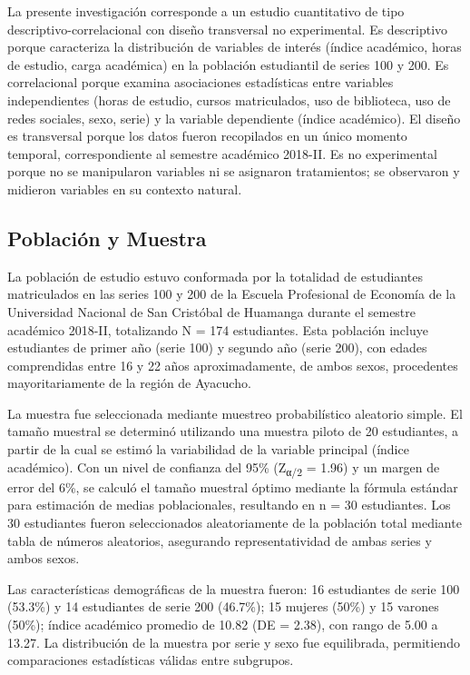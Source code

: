\documentclass[
  stu,
  floatsintext,
  longtable,
  a4paper,
  nolmodern,
  notxfonts,
  notimes,
  12pt,
  colorlinks=true,linkcolor=blue,citecolor=blue,urlcolor=blue]{apa7}
\begin{document}
La presente investigación corresponde a un estudio cuantitativo de tipo
descriptivo-correlacional con diseño transversal no experimental. Es
descriptivo porque caracteriza la distribución de variables de interés
(índice académico, horas de estudio, carga académica) en la población
estudiantil de series 100 y 200. Es correlacional porque examina
asociaciones estadísticas entre variables independientes (horas de
estudio, cursos matriculados, uso de biblioteca, uso de redes sociales,
sexo, serie) y la variable dependiente (índice académico). El diseño es
transversal porque los datos fueron recopilados en un único momento
temporal, correspondiente al semestre académico 2018-II. Es no
experimental porque no se manipularon variables ni se asignaron
tratamientos; se observaron y midieron variables en su contexto natural.

\subsection{Población y Muestra}\label{poblaciuxf3n-y-muestra}

La población de estudio estuvo conformada por la totalidad de
estudiantes matriculados en las series 100 y 200 de la Escuela
Profesional de Economía de la Universidad Nacional de San Cristóbal de
Huamanga durante el semestre académico 2018-II, totalizando N = 174
estudiantes. Esta población incluye estudiantes de primer año (serie
100) y segundo año (serie 200), con edades comprendidas entre 16 y 22
años aproximadamente, de ambos sexos, procedentes mayoritariamente de la
región de Ayacucho.

La muestra fue seleccionada mediante muestreo probabilístico aleatorio
simple. El tamaño muestral se determinó utilizando una muestra piloto de
20 estudiantes, a partir de la cual se estimó la variabilidad de la
variable principal (índice académico). Con un nivel de confianza del
95\% (Z\textsubscript{α/2} = 1.96) y un margen de error del 6\%, se
calculó el tamaño muestral óptimo mediante la fórmula estándar para
estimación de medias poblacionales, resultando en n = 30 estudiantes.
Los 30 estudiantes fueron seleccionados aleatoriamente de la población
total mediante tabla de números aleatorios, asegurando representatividad
de ambas series y ambos sexos.

Las características demográficas de la muestra fueron: 16 estudiantes de
serie 100 (53.3\%) y 14 estudiantes de serie 200 (46.7\%); 15 mujeres
(50\%) y 15 varones (50\%); índice académico promedio de 10.82 (DE =
2.38), con rango de 5.00 a 13.27. La distribución de la muestra por
serie y sexo fue equilibrada, permitiendo comparaciones estadísticas
válidas entre subgrupos.
\end{document}
